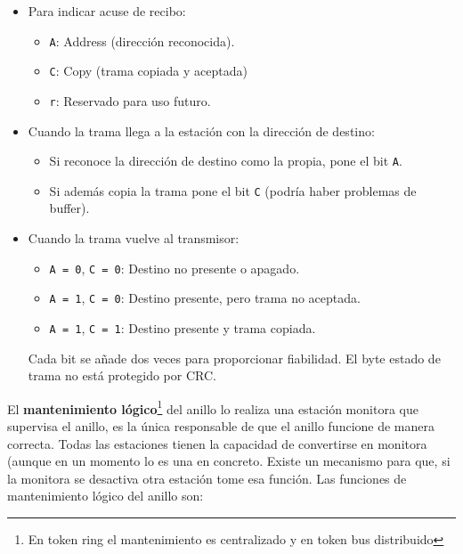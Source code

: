\documentclass[10pt,portrait, twocolumn]{article}
\begin{document}
\begin{itemize}
	\begin{itemize}
	\item Para indicar acuse de recibo:
		\begin{itemize}
		\item \texttt{A}: Address (dirección reconocida).
		\item \texttt{C}: Copy (trama copiada y aceptada)
		\item \texttt{r}: Reservado para uso futuro.
		\end{itemize}
	\item Cuando la trama llega a la estación con la dirección de destino:
		\begin{itemize}
		\item Si reconoce la dirección de destino como la propia, pone el bit \texttt{A}.
		\item Si además copia la trama pone el bit \texttt{C} (podría haber problemas de buffer).
		\end{itemize}
	\item Cuando la trama vuelve al transmisor:
		\begin{itemize}
		\item \texttt{A = 0}, \texttt{C = 0}: Destino no presente o apagado.
		\item \texttt{A = 1}, \texttt{C = 0}: Destino presente, pero trama no aceptada.
		\item \texttt{A = 1}, \texttt{C = 1}: Destino presente y trama copiada.
		\end{itemize}
	Cada bit se añade dos veces para proporcionar fiabilidad. El byte estado de trama no está protegido por CRC.
	\end{itemize}
\end{itemize}

El \textbf{mantenimiento lógico}\footnote{En token ring el mantenimiento es centralizado y en token bus distribuido} del anillo lo realiza una estación monitora que supervisa el anillo, es la única responsable de que el anillo funcione de manera correcta. Todas las estaciones tienen la capacidad de convertirse en monitora (aunque en un momento lo es una en concreto. Existe un mecanismo para que, si la monitora se desactiva otra estación tome esa función. Las funciones de mantenimiento lógico del anillo son:
\end{document}
